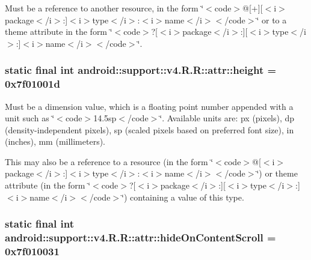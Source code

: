Must be a reference to another resource, in the form \char`\"{}$<$code$>$@\mbox{[}+\mbox{]}\mbox{[}$<$i$>$package$<$/i$>$:\mbox{]}$<$i$>$type$<$/i$>$:$<$i$>$name$<$/i$>$$<$/code$>$\char`\"{} or to a theme attribute in the form \char`\"{}$<$code$>$?\mbox{[}$<$i$>$package$<$/i$>$:\mbox{]}\mbox{[}$<$i$>$type$<$/i$>$:\mbox{]}$<$i$>$name$<$/i$>$$<$/code$>$\char`\"{}. \hypertarget{classandroid_1_1support_1_1v4_1_1_r_1_1attr_a2acbef746ccc82d990fcd7240b96ccc}{
\subsubsection[{height}]{\setlength{\rightskip}{0pt plus 5cm}static final int android::support::v4.R.R::attr::height = 0x7f01001d}}
\label{classandroid_1_1support_1_1v4_1_1_r_1_1attr_a2acbef746ccc82d990fcd7240b96ccc}


Must be a dimension value, which is a floating point number appended with a unit such as \char`\"{}$<$code$>$14.5sp$<$/code$>$\char`\"{}. Available units are: px (pixels), dp (density-independent pixels), sp (scaled pixels based on preferred font size), in (inches), mm (millimeters). 

This may also be a reference to a resource (in the form \char`\"{}$<$code$>$@\mbox{[}$<$i$>$package$<$/i$>$:\mbox{]}$<$i$>$type$<$/i$>$:$<$i$>$name$<$/i$>$$<$/code$>$\char`\"{}) or theme attribute (in the form \char`\"{}$<$code$>$?\mbox{[}$<$i$>$package$<$/i$>$:\mbox{]}\mbox{[}$<$i$>$type$<$/i$>$:\mbox{]}$<$i$>$name$<$/i$>$$<$/code$>$\char`\"{}) containing a value of this type. \hypertarget{classandroid_1_1support_1_1v4_1_1_r_1_1attr_a671e6698e7737a9495c216f60aef1b6}{
\subsubsection[{hideOnContentScroll}]{\setlength{\rightskip}{0pt plus 5cm}static final int android::support::v4.R.R::attr::hideOnContentScroll = 0x7f010031}}
\label{classandroid_1_1support_1_1v4_1_1_r_1_1attr_a671e6698e7737a9495c216f60aef1b6}


